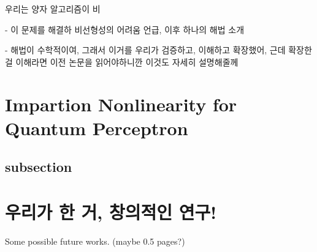 우리는 양자 알고리즘이 비

- 이 문제를 해결하 비선형성의 어려움 언급, 이후 하나의 해법 소개

- 해법이 수학적이여, 그래서 이거를 우리가 검증하고, 이해하고 확장했어, 근데 확장한걸 이해라면 이전 논문을 읽어야하니깐 이것도 자세히 설명해줄께

\section{Impartion Nonlinearity for Quantum Perceptron}

\subsection{subsection}

\section{우리가 한 거, 창의적인 연구!}
Some possible future works. (maybe 0.5 pages?)